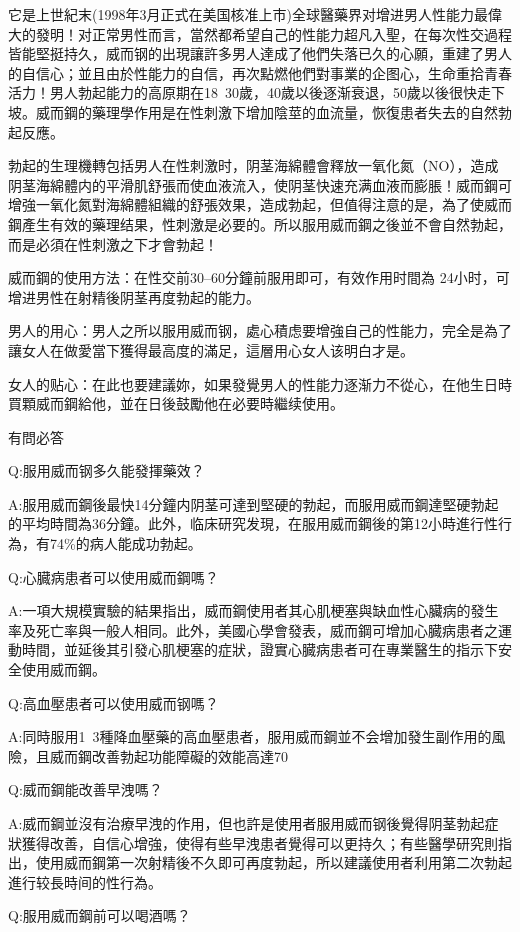 \documentclass[12pt,UTF8]{ctexbook}
\begin{document}
它是上世紀末(1998年3月正式在美国核准上市)全球醫藥界对增进男人性能力最偉大的發明！对正常男性而言，當然都希望自己的性能力超凡入聖，在每次性交過程皆能堅挺持久，威而钢的出現讓許多男人達成了他們失落已久的心願，重建了男人的自信心；並且由於性能力的自信，再次點燃他們對事業的企图心，生命重拾青春活力！男人勃起能力的高原期在18~30歲，40歲以後逐渐衰退，50歲以後很快走下坡。威而鋼的藥理學作用是在性刺激下增加陰莖的血流量，恢復患者失去的自然勃起反應。

勃起的生理機轉包括男人在性刺激时，阴茎海綿體會釋放一氧化氮（NO），造成阴茎海綿體内的平滑肌舒張而使血液流入，使阴茎快速充满血液而膨脹！威而鋼可增強一氧化氮對海綿體組織的舒張效果，造成勃起，但值得注意的是，為了使威而鋼產生有效的藥理结果，性刺激是必要的。所以服用威而鋼之後並不會自然勃起，而是必須在性刺激之下才會勃起！

威而鋼的使用方法：在性交前30--60分鐘前服用即可，有效作用时間為
24小时，可增进男性在射精後阴茎再度勃起的能力。

男人的用心：男人之所以服用威而钢，處心積虑要增強自己的性能力，完全是為了讓女人在做愛當下獲得最高度的滿足，這層用心女人该明白才是。

女人的贴心：在此也要建議妳，如果發覺男人的性能力逐渐力不從心，在他生日時買顆威而鋼給他，並在日後鼓勵他在必要時繼续使用。

有問必答

Q:服用威而钢多久能發揮藥效？

A:服用威而鋼後最快14分鐘内阴茎可達到堅硬的勃起，而服用威而鋼達堅硬勃起的平均時間為36分鐘。此外，临床研究发現，在服用威而鋼後的第12小時進行性行為，有74\%的病人能成功勃起。

Q:心臓病患者可以使用威而鋼嗎？

A:一項大規模實驗的結果指出，威而鋼使用者其心肌梗塞與缺血性心臟病的發生率及死亡率與一般人相同。此外，美國心學會發表，威而鋼可增加心臓病患者之運動時間，並延後其引發心肌梗塞的症狀，證實心臓病患者可在專業醫生的指示下安全使用威而鋼。

Q:高血壓患者可以使用威而钢嗎？

A:同時服用1~3種降血壓藥的高血壓患者，服用威而鋼並不会增加發生副作用的風險，且威而鋼改善勃起功能障礙的效能高達70%

Q:威而鋼能改善早洩嗎？

A:威而鋼並沒有治療早洩的作用，但也許是使用者服用威而钢後覺得阴茎勃起症狀獲得改善，自信心增強，使得有些早洩患者覺得可以更持久；有些醫學研究則指出，使用威而鋼第一次射精後不久即可再度勃起，所以建議使用者利用第二次勃起進行较長時间的性行為。

Q:服用威而鋼前可以喝酒嗎？
\end{document}
